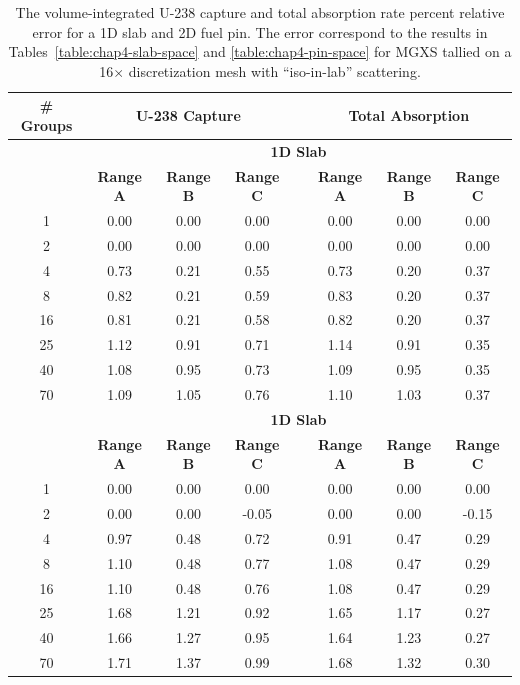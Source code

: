 \begin{table}[h!]
  \centering
  \caption[Reaction rate relative errors]{The volume-integrated U-238 capture and total absorption rate percent relative error for a 1D slab and 2D fuel pin. The error correspond to the results in Tables~\ref{table:chap4-slab-space} and \ref{table:chap4-pin-space} for \ac{MGXS} tallied on a 16$\times$ discretization mesh with ``iso-in-lab'' scattering.}
  \small
  \label{table:chap4-rxn-rate-errors} 
  \vspace{6pt}
  \begin{tabular}{c c c c c c c c}
  \toprule
  \multicolumn{1}{c}{\bf \# Groups} &
  \multicolumn{3}{c}{\bf U-238 Capture} &
  \multicolumn{1}{c}{} &
  \multicolumn{3}{c}{\bf Total Absorption} \\
  \midrule
  & \multicolumn{7}{c}{\bf 1D Slab} \\
  \cline{2-8}
  & \multicolumn{1}{c}{\bf Range A} &
  \multicolumn{1}{c}{\bf Range B} &
  \multicolumn{1}{c}{\bf Range C} &
  \multicolumn{1}{c}{} &
  \multicolumn{1}{c}{\bf Range A} &
  \multicolumn{1}{c}{\bf Range B} &
  \multicolumn{1}{c}{\bf Range C} \\
  \cline{2-4} \cline{6-8}
1 & 0.00 & 0.00 & 0.00 & & 0.00 & 0.00 & 0.00 \\
2 & 0.00 & 0.00 & 0.00 & & 0.00 & 0.00 & 0.00 \\
4 & 0.73 & 0.21 & 0.55 & & 0.73 & 0.20 & 0.37 \\
8 & 0.82 & 0.21 & 0.59 & & 0.83 & 0.20 & 0.37 \\
16 & 0.81 & 0.21 & 0.58 & & 0.82 & 0.20 & 0.37 \\
25 & 1.12 & 0.91 & 0.71 & & 1.14 & 0.91 & 0.35 \\
40 & 1.08 & 0.95 & 0.73 & & 1.09 & 0.95 & 0.35 \\
70 & 1.09 & 1.05 & 0.76 & & 1.10 & 1.03 & 0.37 \\
  \cline{2-8}
  & \multicolumn{7}{c}{\bf 1D Slab} \\
  \cline{2-8}
  & \multicolumn{1}{c}{\bf Range A} &
  \multicolumn{1}{c}{\bf Range B} &
  \multicolumn{1}{c}{\bf Range C} &
  \multicolumn{1}{c}{} &
  \multicolumn{1}{c}{\bf Range A} &
  \multicolumn{1}{c}{\bf Range B} &
  \multicolumn{1}{c}{\bf Range C} \\
  \cline{2-4} \cline{6-8}
1 & 0.00 & 0.00 & 0.00 & & 0.00 & 0.00 & 0.00 \\
2 & 0.00 & 0.00 & -0.05 & & 0.00 & 0.00 & -0.15 \\
4 & 0.97 & 0.48 & 0.72 & & 0.91 & 0.47 & 0.29 \\
8 & 1.10 & 0.48 & 0.77 & & 1.08 & 0.47 & 0.29 \\
16 & 1.10 & 0.48 & 0.76 & & 1.08 & 0.47 & 0.29 \\
25 & 1.68 & 1.21 & 0.92 & & 1.65 & 1.17 & 0.27 \\
40 & 1.66 & 1.27 & 0.95 & & 1.64 & 1.23 & 0.27 \\
70 & 1.71 & 1.37 & 0.99 & & 1.68 & 1.32 & 0.30 \\
  \bottomrule
\end{tabular}
\end{table}

